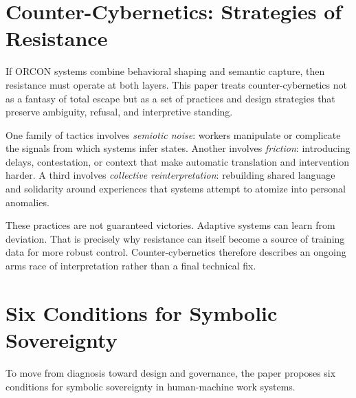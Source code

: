 \documentclass[11pt, a4paper]{article}
\begin{document}
\section{Counter-Cybernetics: Strategies of Resistance}

If ORCON systems combine behavioral shaping and semantic capture, then resistance must operate at both layers. This paper treats counter-cybernetics not as a fantasy of total escape but as a set of practices and design strategies that preserve ambiguity, refusal, and interpretive standing.

One family of tactics involves \emph{semiotic noise}: workers manipulate or complicate the signals from which systems infer states. Another involves \emph{friction}: introducing delays, contestation, or context that make automatic translation and intervention harder. A third involves \emph{collective reinterpretation}: rebuilding shared language and solidarity around experiences that systems attempt to atomize into personal anomalies.

These practices are not guaranteed victories. Adaptive systems can learn from deviation. That is precisely why resistance can itself become a source of training data for more robust control. Counter-cybernetics therefore describes an ongoing arms race of interpretation rather than a final technical fix.

\section{Six Conditions for Symbolic Sovereignty}

To move from diagnosis toward design and governance, the paper proposes six conditions for symbolic sovereignty in human-machine work systems.
\end{document}

